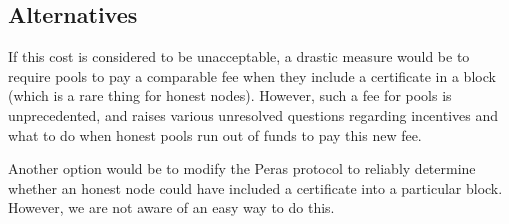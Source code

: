 \subsection{Alternatives}
If this cost is considered to be unacceptable, a drastic measure would be to require pools to pay a comparable fee when they include a certificate in a block (which is a rare thing for honest nodes).
However, such a fee for pools is unprecedented, and raises various unresolved questions regarding incentives and what to do when honest pools run out of funds to pay this new fee.

Another option would be to modify the Peras protocol to reliably determine whether an honest node could have included a certificate into a particular block.
However, we are not aware of an easy way to do this.



